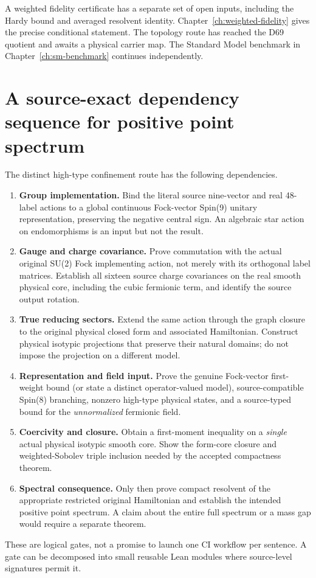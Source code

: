 A weighted fidelity certificate has a separate set of open inputs,
including the Hardy bound and averaged resolvent identity.
Chapter~\ref{ch:weighted-fidelity} gives the precise conditional
statement. The topology route has reached the D69 quotient and
awaits a physical carrier map. The Standard Model benchmark in
Chapter~\ref{ch:sm-benchmark} continues independently.

\section{A source-exact dependency sequence for positive point spectrum}
The distinct high-type confinement route has the following dependencies.
\begin{enumerate}[label=\textbf{Gate \arabic*.},leftmargin=*,itemsep=.45em]
\item \textbf{Group implementation.} Bind the literal source nine-vector
and real 48-label actions to a global continuous Fock-vector
Spin(9) unitary representation, preserving the negative central sign.
An algebraic star action on endomorphisms is an input but not the result.
\item \textbf{Gauge and charge covariance.} Prove commutation with the
actual original SU(2) Fock implementing action, not merely with its
orthogonal label matrices. Establish all sixteen source charge
covariances on the real smooth physical core, including the cubic
fermionic term, and identify the source output rotation.
\item \textbf{True reducing sectors.} Extend the same action through
the graph closure to the original physical closed form and associated
Hamiltonian. Construct physical isotypic projections that preserve
their natural domains; do not impose the projection on a different
model.
\item \textbf{Representation and field input.} Prove the genuine
Fock-vector first-weight bound (or state a distinct operator-valued
model), source-compatible Spin(8) branching, nonzero high-type physical
states, and a source-typed bound for the \emph{unnormalized} fermionic
field.
\item \textbf{Coercivity and closure.} Obtain a first-moment
inequality on a \emph{single} actual physical isotypic smooth core.
Show the form-core closure and weighted-Sobolev triple inclusion
needed by the accepted compactness theorem.
\item \textbf{Spectral consequence.} Only then prove compact
resolvent of the appropriate restricted original Hamiltonian and
establish the intended positive point spectrum. A claim about the
entire full spectrum or a mass gap would require a separate theorem.
\end{enumerate}
These are logical gates, not a promise to launch one CI workflow per
sentence. A gate can be decomposed into small reusable Lean modules
where source-level signatures permit it.

